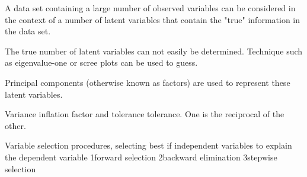 
A data set containing a large number of observed variables can be considered in the context of a number of latent variables that contain the "true" information in the data set.

The true number of latent variables can not easily be determined. Technique such as eigenvalue-one or scree plots can be used to guess. 

Principal components (otherwise known as factors) are used to represent these latent variables. 

 
Variance inflation factor and tolerance tolerance. One is the reciprocal of the other. 


Variable selection procedures, selecting best if independent variables to explain the dependent variable
1forward selection
2backward elimination
3stepwise selection
